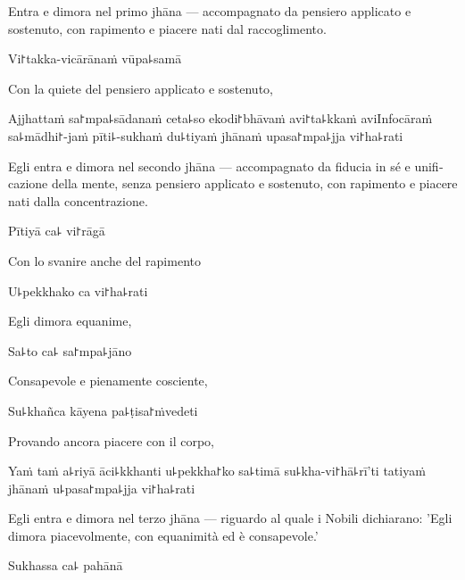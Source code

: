 \begin{english}
  Entra e dimora nel primo jhāna — accompagnato da pensiero applicato e sostenuto, con rapimento e piacere nati dal raccoglimento.
\end{english}

Vi꜓takka-vicārānaṁ vūpa꜕samā

\begin{english}
  Con la quiete del pensiero applicato e sostenuto,
\end{english}

Ajjhattaṁ sa꜓mpa꜕sādanaṁ ceta꜕so ekodi꜓bhāvaṁ avi꜓ta꜕kkaṁ aviInfocāraṁ sa꜕mādhi꜓-jaṁ pīti꜕-sukhaṁ du꜕tiyaṁ jhānaṁ upasa꜓mpa꜕jja vi꜓ha꜕rati

\begin{english}
  Egli entra e dimora nel secondo jhāna — accompagnato da fiducia in sé e unificazione della mente, senza pensiero applicato e sostenuto, con rapimento e piacere nati dalla concentrazione.
\end{english}

\clearpage

Pītiyā ca꜕ vi꜓rāgā

\begin{english}
  Con lo svanire anche del rapimento
\end{english}

U꜕pekkhako ca vi꜓ha꜕rati

\begin{english}
  Egli dimora equanime,
\end{english}

Sa꜕to ca꜕ sa꜓mpa꜕jāno

\begin{english}
  Consapevole e pienamente cosciente,
\end{english}

Su꜕khañca kāyena pa꜕ṭisa꜓ṁvedeti

\begin{english}
  Provando ancora piacere con il corpo,
\end{english}

Yaṁ taṁ a꜕riyā āci꜕kkhanti u꜕pekkha꜓ko sa꜕timā su꜕kha-vi꜓hā꜕rī'ti tatiyaṁ jhānaṁ u꜕pasa꜓mpa꜕jja vi꜓ha꜕rati

\begin{english}
  Egli entra e dimora nel terzo jhāna — riguardo al quale i Nobili dichiarano: 'Egli dimora piacevolmente, con equanimità ed è consapevole.'
\end{english}

Sukhassa ca꜕ pahānā

